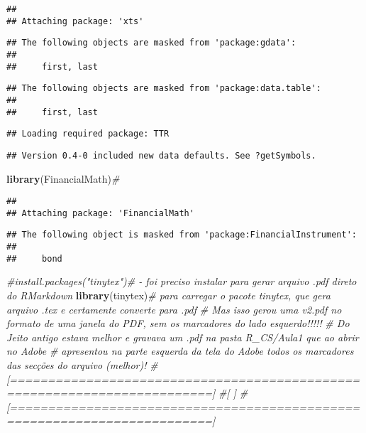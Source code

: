 \documentclass[]{article}
\newenvironment{Shaded}{\begin{snugshade}}{\end{snugshade}}
\newcommand{\KeywordTok}[1]{\textcolor[rgb]{0.13,0.29,0.53}{\textbf{#1}}}
\newcommand{\CommentTok}[1]{\textcolor[rgb]{0.56,0.35,0.01}{\textit{#1}}}
\newcommand{\NormalTok}[1]{#1}
\begin{document}
\begin{verbatim}
## 
## Attaching package: 'xts'
\end{verbatim}

\begin{verbatim}
## The following objects are masked from 'package:gdata':
## 
##     first, last
\end{verbatim}

\begin{verbatim}
## The following objects are masked from 'package:data.table':
## 
##     first, last
\end{verbatim}

\begin{verbatim}
## Loading required package: TTR
\end{verbatim}

\begin{verbatim}
## Version 0.4-0 included new data defaults. See ?getSymbols.
\end{verbatim}

\begin{Shaded}
\begin{Highlighting}[]
\KeywordTok{library}\NormalTok{(FinancialMath)}\CommentTok{#}
\end{Highlighting}
\end{Shaded}

\begin{verbatim}
## 
## Attaching package: 'FinancialMath'
\end{verbatim}

\begin{verbatim}
## The following object is masked from 'package:FinancialInstrument':
## 
##     bond
\end{verbatim}

\begin{Shaded}
\begin{Highlighting}[]
\CommentTok{#install.packages("tinytex")#   - foi preciso instalar para gerar arquivo .pdf direto do RMarkdown}
\KeywordTok{library}\NormalTok{(tinytex)}\CommentTok{# para carregar o pacote tinytex, que gera arquivo .tex e certamente converte para .pdf}
\CommentTok{#                  Mas isso gerou uma v2.pdf no formato de uma janela do PDF, sem os marcadores do lado esquerdo!!!!!}
\CommentTok{#                  Do Jeito antigo estava melhor e gravava um .pdf na pasta R_CS/Aula1 que ao abrir no Adobe}
\CommentTok{#                  apresentou na parte esquerda da tela do Adobe todos os marcadores das secções do arquivo (melhor)!}
\CommentTok{#[=========================================================================]}
\CommentTok{#[                                                                         ]}
\CommentTok{#[=========================================================================]}
\end{Highlighting}
\end{Shaded}
\end{document}
